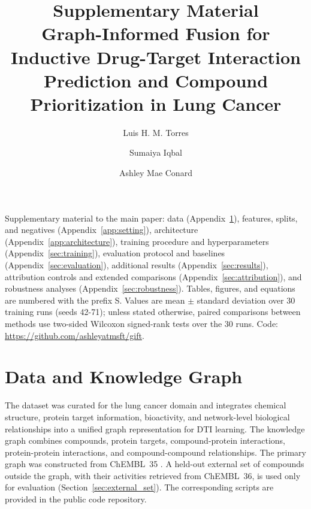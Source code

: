 \documentclass[11pt,letterpaper]{article}
\begin{document}
\title{Supplementary Material\\[0.5em]\large Graph-Informed Fusion for Inductive Drug-Target Interaction Prediction and Compound Prioritization in Lung Cancer}

\author[1,2]{Luis H. M. Torres}
\author[3]{Sumaiya Iqbal}
\author[1]{Ashley Mae Conard}


\date{}

\maketitle

\noindent Supplementary material to the main paper: data (Appendix~\ref{app:data}), features, splits, and negatives (Appendix~\ref{app:setting}), architecture (Appendix~\ref{app:architecture}), training procedure and hyperparameters (Appendix~\ref{sec:training}), evaluation protocol and baselines (Appendix~\ref{sec:evaluation}), additional results (Appendix~\ref{sec:results}), attribution controls and extended comparisons (Appendix~\ref{sec:attribution}), and robustness analyses (Appendix~\ref{sec:robustness}). Tables, figures, and equations are numbered with the prefix S. Values are mean $\pm$ standard deviation over 30 training runs (seeds 42-71); unless stated otherwise, paired comparisons between methods use two-sided Wilcoxon signed-rank tests over the 30 runs. Code: \url{https://github.com/ashleyatmsft/gift}.

\section{Data and Knowledge Graph}
\label{app:data}

The dataset was curated for the lung cancer domain and integrates chemical structure, protein target information, bioactivity, and network-level biological relationships into a unified graph representation for DTI learning. The knowledge graph combines compounds, protein targets, compound-protein interactions, protein-protein interactions, and compound-compound relationships. The primary graph was constructed from ChEMBL~35 \cite{zdrazil2024chembl}. A held-out external set of compounds outside the graph, with their activities retrieved from ChEMBL~36, is used only for evaluation (Section~\ref{sec:external_set}). The corresponding scripts are provided in the public code repository.
\end{document}
